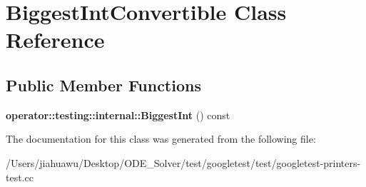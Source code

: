 \hypertarget{class_biggest_int_convertible}{}\section{Biggest\+Int\+Convertible Class Reference}
\label{class_biggest_int_convertible}
\subsection*{Public Member Functions}
\begin{DoxyCompactItemize}
\item 
\mbox{\label{class_biggest_int_convertible_aa3dc4bbff87d412758b9adbefa19c6d0}} 
{\bfseries operator\+::testing\+::internal\+::\+Biggest\+Int} () const
\end{DoxyCompactItemize}


The documentation for this class was generated from the following file\+:\begin{DoxyCompactItemize}
\item 
/\+Users/jiahuawu/\+Desktop/\+O\+D\+E\+\_\+\+Solver/test/googletest/test/googletest-\/printers-\/test.\+cc\end{DoxyCompactItemize}

